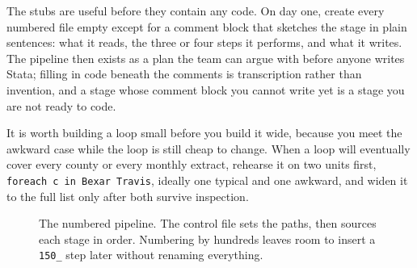\documentclass[
    a4paper,
    fontsize=10pt,
    twoside=true,
    numbers=noenddot,
]{kaobook}
\begin{document}
The stubs are useful before they contain any code. On day one, create every numbered file empty except for a comment block that sketches the stage in plain sentences: what it reads, the three or four steps it performs, and what it writes. The pipeline then exists as a plan the team can argue with before anyone writes Stata; filling in code beneath the comments is transcription rather than invention, and a stage whose comment block you cannot write yet is a stage you are not ready to code.

It is worth building a loop small before you build it wide, because you meet the awkward case while the loop is still cheap to change. When a loop will eventually cover every county or every monthly extract, rehearse it on two units first, \texttt{foreach c in Bexar Travis}, ideally one typical and one awkward, and widen it to the full list only after both survive inspection.

\begin{figure}[htbp]
\centering
{}
\caption[The numbered pipeline]{The numbered pipeline. The control file sets the paths, then sources each stage in order. Numbering by hundreds leaves room to insert a \texttt{150\_} step later without renaming everything.}
\label{fig:numbered}
\end{figure}
\end{document}
